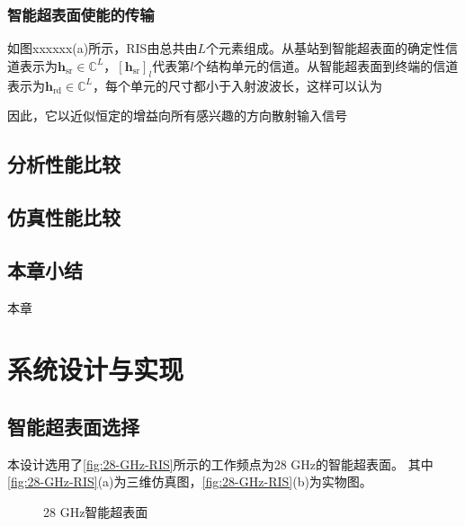 \documentclass[supercite]{HustGraduPaper}
\begin{document}
\subsubsection{智能超表面使能的传输}

如图xxxxxx(a)所示，RIS由总共由$L$个元素组成。从基站到智能超表面的确定性信道表示为$\mathbf{h}_{\mathrm{sr}} \in \mathbb{C}^{L}$，$\left[\mathbf{h}_{\mathrm{sr}}\right]_{l}$代表第$l$个结构单元的信道。从智能超表面到终端的信道表示为$\mathbf{h}_{\mathrm{rd}} \in \mathbb{C}^{L}$，每个单元的尺寸都小于入射波波长，这样可以认为\cite{emil2019intelligent}

因此，它以近似恒定的增益向所有感兴趣的方向散射输入信号


\subsection{分析性能比较}
\subsection{仿真性能比较}
\subsection{本章小结}

本章

\section{系统设计与实现}\label{sec:design}

\subsection{智能超表面选择}\label{subsec:28-GHz-RIS}

本设计选用了\autoref{fig:28-GHz-RIS}所示的工作频点为28 GHz的智能超表面。
其中\autoref{fig:28-GHz-RIS}(a)为三维仿真图，\autoref{fig:28-GHz-RIS}(b)为实物图。

\begin{figure}[htb]
	\centering
	\hfil
	\caption{28 GHz智能超表面}
	\label{fig:28-GHz-RIS}
\end{figure}
\end{document}
